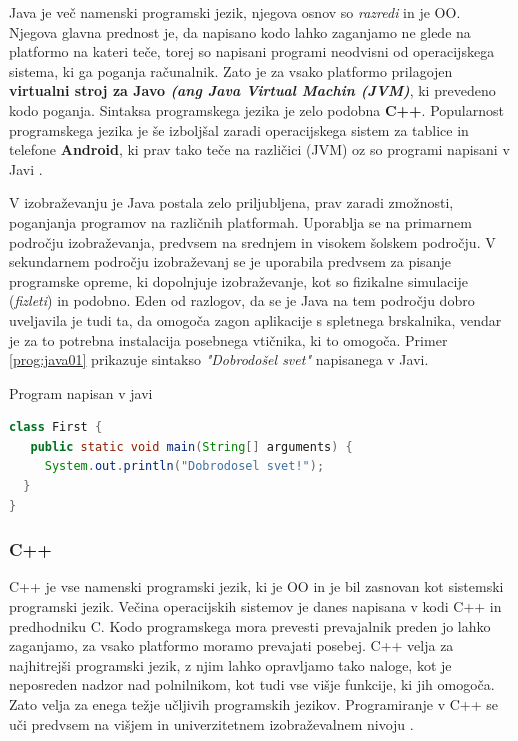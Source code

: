 Java je več namenski programski jezik, njegova osnov so \emph{razredi}
in je OO. Njegova glavna prednost je, da napisano kodo lahko zaganjamo
ne glede na platformo na kateri teče, torej so napisani programi
neodvisni od operacijskega sistema, ki ga poganja računalnik. Zato je
za vsako platformo prilagojen \textbf{virtualni stroj za Javo
  \emph{(ang Java Virtual Machin (JVM)}}, ki prevedeno kodo
poganja. Sintaksa programskega jezika je zelo podobna
\textbf{C++}. Popularnost programskega jezika je še izboljšal zaradi
operacijskega sistem za tablice in telefone \textbf{Android}, ki prav
tako teče na različici (JVM) oz so programi napisani v Javi
\cite{wiki:java}.

V izobraževanju je Java postala zelo priljubljena, prav zaradi
zmožnosti, poganjanja programov na različnih platformah. Uporablja se
na primarnem področju izobraževanja, predvsem na srednjem in visokem
šolskem področju. V sekundarnem področju izobraževanj se je uporabila
predvsem za pisanje programske opreme, ki dopolnjuje izobraževanje,
kot so fizikalne simulacije (\emph{fizleti}) in podobno. Eden od
razlogov, da se je Java na tem področju dobro uveljavila je tudi ta,
da omogoča zagon aplikacije s spletnega brskalnika, vendar je za to
potrebna instalacija posebnega vtičnika, ki to omogoča. Primer
\ref{prog:java01} prikazuje sintakso \emph{"Dobrodošel svet"}
napisanega v Javi.
\begin{examplebox}[label={prog:java01}]{Program napisan v javi}
\begin{lstlisting}[language=Java]
class First {
   public static void main(String[] arguments) {
     System.out.println("Dobrodosel svet!");
  }
}
\end{lstlisting}
\end{examplebox}

\subsubsection{C++}
\label{sec:pj_c++}

C++ je vse namenski programski jezik, ki je OO in je bil zasnovan kot
sistemski programski jezik. Večina operacijskih sistemov je danes
napisana v kodi C++ in predhodniku C. Kodo programskega mora prevesti
prevajalnik preden jo lahko zaganjamo, za vsako platformo moramo
prevajati posebej.  C++ velja za najhitrejši programski jezik, z njim
lahko opravljamo tako naloge, kot je neposreden nadzor nad
polnilnikom, kot tudi vse višje funkcije, ki jih omogoča. Zato velja
za enega težje učljivih programskih jezikov. Programiranje v C++ se
uči predvsem na višjem in univerzitetnem izobraževalnem nivoju \cite{wiki:cpp}.

